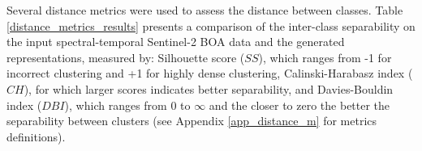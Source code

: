 \documentclass[journal,article,submit,pdftex,moreauthors]{Definitions/mdpi}
\begin{document}

Several distance metrics were used to assess the distance between classes. Table \ref{distance_metrics_results} presents a comparison of the inter-class separability on the input spectral-temporal Sentinel-2 BOA data and the generated representations, measured by: Silhouette score ($SS$), which ranges from -1 for incorrect clustering and +1 for highly dense clustering, Calinski-Harabasz index ($CH$), for which larger scores indicates better separability, and Davies-Bouldin index ($DBI$), which ranges from 0 to $\infty$ and the closer to zero the better the separability between clusters (see Appendix \ref{app_distance_m} for metrics definitions).
\end{document}
